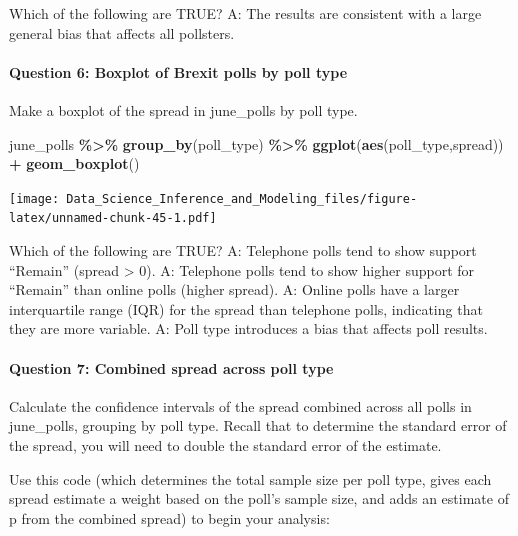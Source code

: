 \documentclass[
]{article}
\newenvironment{Shaded}{\begin{snugshade}}{\end{snugshade}}
\newcommand{\KeywordTok}[1]{\textcolor[rgb]{0.13,0.29,0.53}{\textbf{#1}}}
\newcommand{\NormalTok}[1]{#1}
\newcommand{\OperatorTok}[1]{\textcolor[rgb]{0.81,0.36,0.00}{\textbf{#1}}}
\newcommand{\StringTok}[1]{\textcolor[rgb]{0.31,0.60,0.02}{#1}}
\begin{document}
Which of the following are TRUE? A: The results are consistent with a
large general bias that affects all pollsters.

\hypertarget{question-6-boxplot-of-brexit-polls-by-poll-type}{%
\paragraph{Question 6: Boxplot of Brexit polls by poll
type}\label{question-6-boxplot-of-brexit-polls-by-poll-type}}

Make a boxplot of the spread in june\_polls by poll type.

\begin{Shaded}
\begin{Highlighting}[]
\NormalTok{june\_polls }\OperatorTok{\%\textgreater{}\%}\StringTok{ }\KeywordTok{group\_by}\NormalTok{(poll\_type) }\OperatorTok{\%\textgreater{}\%}
\StringTok{  }\KeywordTok{ggplot}\NormalTok{(}\KeywordTok{aes}\NormalTok{(poll\_type,spread)) }\OperatorTok{+}
\StringTok{  }\KeywordTok{geom\_boxplot}\NormalTok{()}
\end{Highlighting}
\end{Shaded}

\texttt{[image: Data\_Science\_Inference\_and\_Modeling\_files/figure-latex/unnamed-chunk-45-1.pdf]}

Which of the following are TRUE? A: Telephone polls tend to show support
``Remain'' (spread \textgreater{} 0). A: Telephone polls tend to show
higher support for ``Remain'' than online polls (higher spread). A:
Online polls have a larger interquartile range (IQR) for the spread than
telephone polls, indicating that they are more variable. A: Poll type
introduces a bias that affects poll results.

\hypertarget{question-7-combined-spread-across-poll-type}{%
\paragraph{Question 7: Combined spread across poll
type}\label{question-7-combined-spread-across-poll-type}}

Calculate the confidence intervals of the spread combined across all
polls in june\_polls, grouping by poll type. Recall that to determine
the standard error of the spread, you will need to double the standard
error of the estimate.

Use this code (which determines the total sample size per poll type,
gives each spread estimate a weight based on the poll's sample size, and
adds an estimate of p from the combined spread) to begin your analysis:
\end{document}
